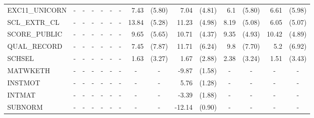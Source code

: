 \documentclass[10pt]{article}
\begin{document}
\begin{table}[htbp]
\begin{tabular}{lrlrlrlrlrlrlrl}
    EXC11\_UNICORN & \multicolumn{1}{c}{-} & \multicolumn{1}{c}{-} & \multicolumn{1}{c}{-} & \multicolumn{1}{c}{-} & \multicolumn{1}{c}{-} & \multicolumn{1}{c}{-} & 7.43  & (5.80) & 7.04  & (4.81) & 6.1   & (5.80) & 6.61  & (5.98) \\
    SCL\_EXTR\_CL & \multicolumn{1}{c}{-} & \multicolumn{1}{c}{-} & \multicolumn{1}{c}{-} & \multicolumn{1}{c}{-} & \multicolumn{1}{c}{-} & \multicolumn{1}{c}{-} & 13.84 & (5.28) & 11.23 & (4.98) & 8.19  & (5.08) & 6.05  & (5.07) \\
    SCORE\_PUBLIC & \multicolumn{1}{c}{-} & \multicolumn{1}{c}{-} & \multicolumn{1}{c}{-} & \multicolumn{1}{c}{-} & \multicolumn{1}{c}{-} & \multicolumn{1}{c}{-} & 9.65  & (5.65) & 10.71 & (4.37) & 9.35  & (4.93) & 10.42 & (4.89) \\
    QUAL\_RECORD & \multicolumn{1}{c}{-} & \multicolumn{1}{c}{-} & \multicolumn{1}{c}{-} & \multicolumn{1}{c}{-} & \multicolumn{1}{c}{-} & \multicolumn{1}{c}{-} & 7.45  & (7.87) & 11.71 & (6.24) & 9.8   & (7.70) & 5.2   & (6.92) \\
    SCHSEL & \multicolumn{1}{c}{-} & \multicolumn{1}{c}{-} & \multicolumn{1}{c}{-} & \multicolumn{1}{c}{-} & \multicolumn{1}{c}{-} & \multicolumn{1}{c}{-} & 1.63  & (3.27) & 1.67  & (2.88) & 2.38  & (3.24) & 1.51  & (3.43) \\
    MATWKETH & \multicolumn{1}{c}{-} & \multicolumn{1}{c}{-} & \multicolumn{1}{c}{-} & \multicolumn{1}{c}{-} & \multicolumn{1}{c}{-} & \multicolumn{1}{c}{-} & \multicolumn{1}{c}{-} & \multicolumn{1}{c}{-} & -9.87 & (1.58) & \multicolumn{1}{c}{-} & \multicolumn{1}{c}{-} & \multicolumn{1}{c}{-} & \multicolumn{1}{c}{-} \\
    INSTMOT & \multicolumn{1}{c}{-} & \multicolumn{1}{c}{-} & \multicolumn{1}{c}{-} & \multicolumn{1}{c}{-} & \multicolumn{1}{c}{-} & \multicolumn{1}{c}{-} & \multicolumn{1}{c}{-} & \multicolumn{1}{c}{-} & 5.76  & (1.28) & \multicolumn{1}{c}{-} & \multicolumn{1}{c}{-} & \multicolumn{1}{c}{-} & \multicolumn{1}{c}{-} \\
    INTMAT & \multicolumn{1}{c}{-} & \multicolumn{1}{c}{-} & \multicolumn{1}{c}{-} & \multicolumn{1}{c}{-} & \multicolumn{1}{c}{-} & \multicolumn{1}{c}{-} & \multicolumn{1}{c}{-} & \multicolumn{1}{c}{-} & -3.39 & (1.88) & \multicolumn{1}{c}{-} & \multicolumn{1}{c}{-} & \multicolumn{1}{c}{-} & \multicolumn{1}{c}{-} \\
    SUBNORM & \multicolumn{1}{c}{-} & \multicolumn{1}{c}{-} & \multicolumn{1}{c}{-} & \multicolumn{1}{c}{-} & \multicolumn{1}{c}{-} & \multicolumn{1}{c}{-} & \multicolumn{1}{c}{-} & \multicolumn{1}{c}{-} & -12.14 & (0.90) & \multicolumn{1}{c}{-} & \multicolumn{1}{c}{-} & \multicolumn{1}{c}{-} & \multicolumn{1}{c}{-} \\

\end{tabular}
\end{table}
\end{document}
